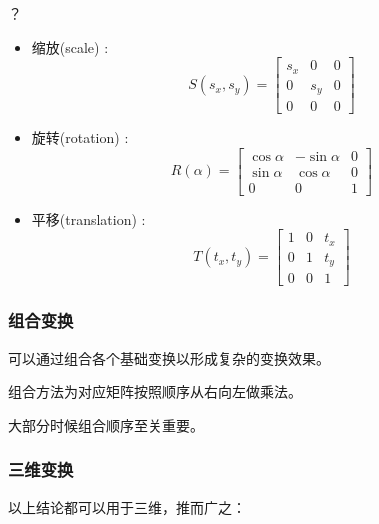 \documentclass[UTF8]{ctexbook}
\begin{document}
{{{{        {？}
        \begin{itemize}
          \item 缩放(scale) : $$S(s_x, s_y) = \left[\begin{matrix}
                      s_x & 0   & 0 \\
                      0   & s_y & 0 \\
                      0   & 0   & 0
                    \end{matrix}\right]$$
          \item 旋转(rotation) : $$R(\alpha) = \left[\begin{matrix}
                      \cos\alpha & -\sin\alpha & 0 \\
                      \sin\alpha & \cos\alpha  & 0 \\
                      0          & 0           & 1
                    \end{matrix}\right]$$
          \item 平移(translation) : $$T(t_x, t_y) = \left[\begin{matrix}
                      1 & 0 & t_x \\
                      0 & 1 & t_y \\
                      0 & 0 & 1
                    \end{matrix}\right]$$
        \end{itemize}

      }%

      \subsubsection{组合变换}{
        可以通过组合各个基础变换以形成复杂的变换效果。

        组合方法为对应矩阵按照顺序从右向左做乘法。

        大部分时候组合顺序至关重要。

      }%

      \subsubsection{三维变换}{
        以上结论都可以用于三维，推而广之：\\

}}}}
\end{document}
